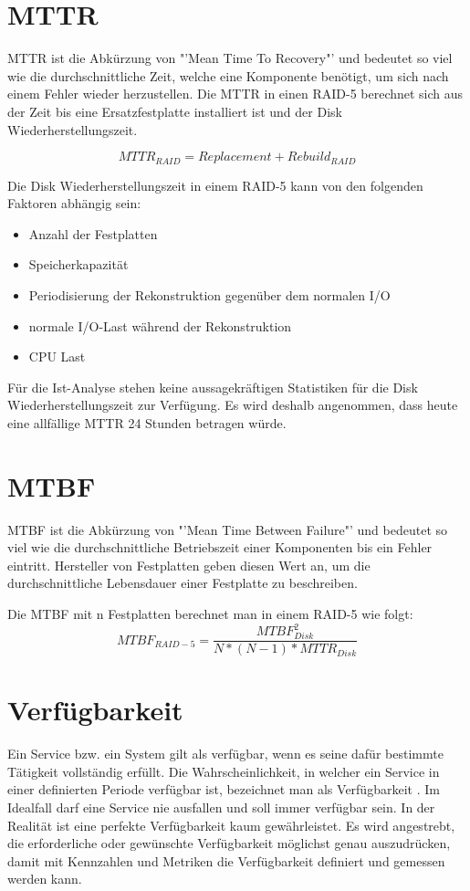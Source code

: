 \section{MTTR}
MTTR  ist die Abkürzung von "'Mean Time To Recovery"' und bedeutet so viel wie die durchschnittliche Zeit, welche eine Komponente benötigt, um sich nach einem Fehler wieder herzustellen. Die MTTR in einen RAID-5 berechnet sich aus der Zeit bis eine Ersatzfestplatte installiert ist und der Disk Wiederherstellungszeit. 

\begin{equation}
MTTR_{RAID}=Replacement+Rebuild_{RAID}
\label{eqn:MTTR-RAID-5}
\end{equation}

Die Disk Wiederherstellungszeit in einem RAID-5 kann von den folgenden Faktoren abhängig sein:
\begin{itemize}
\item Anzahl der Festplatten
\item Speicherkapazität
\item Periodisierung der Rekonstruktion gegenüber dem normalen I/O
\item  normale I/O-Last während der Rekonstruktion
\item  CPU Last
\end{itemize}

Für die Ist-Analyse stehen keine aussagekräftigen Statistiken für die Disk Wiederherstellungszeit zur Verfügung. Es wird deshalb angenommen, dass heute eine allfällige MTTR 24 Stunden betragen würde.


\section{MTBF}
MTBF ist die Abkürzung von "'Mean Time Between Failure"' und bedeutet so viel wie die durchschnittliche Betriebszeit einer Komponenten bis ein Fehler eintritt. Hersteller von Festplatten geben diesen Wert an, um die durchschnittliche Lebensdauer einer Festplatte zu beschreiben. 

Die MTBF mit n Festplatten berechnet man in einem RAID-5 \cite{Chen1994} wie folgt:
\begin{equation}
MTBF_{RAID-5}=\frac{MTBF_{Disk}^2}{N*(N-1)*MTTR_{Disk}}
\label{eqn:MTBF-RAID-5}
\end{equation}

\section{Verfügbarkeit}
Ein Service bzw. ein System gilt als verfügbar, wenn es seine dafür bestimmte Tätigkeit vollständig erfüllt. Die Wahrscheinlichkeit, in welcher ein Service in einer definierten Periode verfügbar ist, bezeichnet man als Verfügbarkeit \cite{Held2004}. Im Idealfall darf eine Service nie ausfallen und soll immer verfügbar sein. In der Realität ist eine perfekte Verfügbarkeit kaum gewährleistet. Es wird angestrebt, die erforderliche oder gewünschte Verfügbarkeit möglichst genau auszudrücken, damit mit Kennzahlen und Metriken die Verfügbarkeit definiert und gemessen werden kann. 

